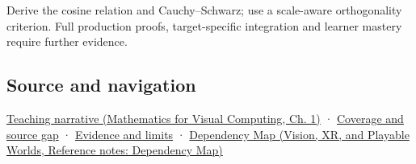 Derive the cosine relation and Cauchy--Schwarz; use a scale-aware orthogonality criterion. Full production proofs, target-specific integration and learner mastery require further evidence.

\subsection{Source and navigation}\label{appendix-8bc4e8fc547c-source-and-navigation}

\hypertarget{appendix-8bc4e8fc547c-source-and-navigation}{}

\href{../02-Mathematics-for-Visual-Computing/main.pdf\#nameddest=01-foundations-i-ch017-the-dot-product-turns-two-movements-into-a-measurement}{Teaching narrative (Mathematics for Visual Computing, Ch. 1)} · \hyperref[appendix-fd090d982a15-phase-6---parts-501-600]{Coverage and source gap} · \hyperref[appendix-a103e7846d21-phase-6---source-analysis-and-verification]{Evidence and limits} · \href{../07-Vision-XR-and-Playable-Worlds/main.pdf\#nameddest=appendix-4ad47bdd269a}{Dependency Map (Vision, XR, and Playable Worlds, Reference notes: Dependency Map)}
